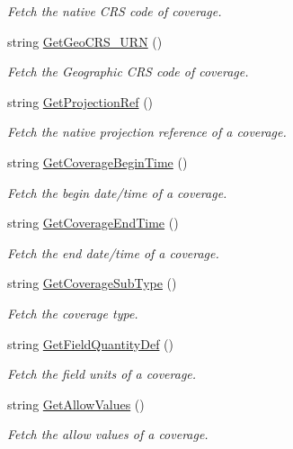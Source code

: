 \begin{DoxyCompactItemize}
\begin{DoxyCompactList}\small\item\em Fetch the native CRS code of coverage. \end{DoxyCompactList}\item 
string \hyperlink{classAbstractDataset_a8172c4de7f03007cd17a54149c801627}{GetGeoCRS\_\-URN} ()
\begin{DoxyCompactList}\small\item\em Fetch the Geographic CRS code of coverage. \end{DoxyCompactList}\item 
string \hyperlink{classAbstractDataset_a2e6cdb6c0d165543a8a4d936835db73b}{GetProjectionRef} ()
\begin{DoxyCompactList}\small\item\em Fetch the native projection reference of a coverage. \end{DoxyCompactList}\item 
string \hyperlink{classAbstractDataset_a90a2e56cacec8d9aa13b6fb66a862bf6}{GetCoverageBeginTime} ()
\begin{DoxyCompactList}\small\item\em Fetch the begin date/time of a coverage. \end{DoxyCompactList}\item 
string \hyperlink{classAbstractDataset_a8193da35dd2e264834ac3af2bd89a0c0}{GetCoverageEndTime} ()
\begin{DoxyCompactList}\small\item\em Fetch the end date/time of a coverage. \end{DoxyCompactList}\item 
string \hyperlink{classAbstractDataset_a505f9a6143ef694db5c7ff324f5c891a}{GetCoverageSubType} ()
\begin{DoxyCompactList}\small\item\em Fetch the coverage type. \end{DoxyCompactList}\item 
string \hyperlink{classAbstractDataset_a641d024862d22d4b8598ffa3dd5ef43e}{GetFieldQuantityDef} ()
\begin{DoxyCompactList}\small\item\em Fetch the field units of a coverage. \end{DoxyCompactList}\item 
string \hyperlink{classAbstractDataset_aa4e7985dc41a9eb44254bbc9782e6b1d}{GetAllowValues} ()
\begin{DoxyCompactList}\small\item\em Fetch the allow values of a coverage. \end{DoxyCompactList}\item 

\end{DoxyCompactItemize}
